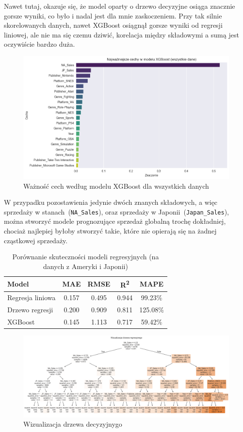 \documentclass[11pt]{article}
\begin{document}
Nawet tutaj, okazuje się, że model oparty o drzewo decyzyjne osiąga znacznie gorsze wyniki,
co było i nadal jest dla mnie zaskoczeniem.
Przy tak silnie skorelowanych danych, nawet XGBoost osiągnął gorsze wyniki od regresji liniowej,
ale nie ma się czemu dziwić, korelacja między składowymi a sumą jest oczywiście bardzo duża.

\begin{figure}[H]
    \centering
    \includegraphics[width=0.9\linewidth]{figures/xgboost-all}
    \caption{Ważność cech według modelu XGBoost dla wszystkich danych}
    \label{fig:xgb_importance2}
\end{figure}

W przypadku pozostawienia jedynie dwóch znanych składowych, a więc sprzedaży w stanach~(\texttt{NA\_Sales}),
oraz sprzedaży w Japonii~(\texttt{Japan\_Sales}),
można stworzyć modele prognozujące sprzedaż globalną trochę dokładniej, chociaż najlepiej byłoby stworzyć takie,
które nie opierają się na żadnej cząstkowej sprzedaży.

\begin{table}[H]
\centering
\begin{tabular}{|l|c|c|c|c|}
\hline
\textbf{Model} & \textbf{MAE} & \textbf{RMSE} & \textbf{R\textsuperscript{2}} & \textbf{MAPE} \\
\hline
Regresja liniowa & 0.157 & 0.495 & 0.944 & 99.23\% \\
Drzewo regresji  & 0.200 & 0.909 & 0.811 & 125.08\% \\
XGBoost          & 0.145 & 1.113 & 0.717 & 59.42\% \\
\hline
\end{tabular}
\caption{Porównanie skuteczności modeli regresyjnych (na danych z Ameryki i Japonii)}
\label{tab:model_comparison3}
\end{table}

\begin{figure}[H]
    \centering
    \includegraphics[width=0.9\linewidth]{figures/tree-last}
    \caption{Wizualizacja drzewa decyzyjnygo}
    \label{fig:tree-last}
\end{figure}
\end{document}

